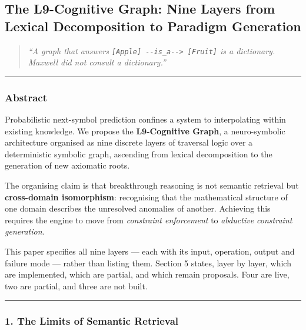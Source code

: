 \documentclass[
  11pt,
  a4paper,
]{article}
\begin{document}
\newpage

\subsection{The L9-Cognitive Graph: Nine Layers from Lexical
Decomposition to Paradigm
Generation}\label{the-l9-cognitive-graph-nine-layers-from-lexical-decomposition-to-paradigm-generation}

\begin{quote}
\emph{``A graph that answers
\texttt{{[}Apple{]}\ -\/-is\_a-\/-\textgreater{}\ {[}Fruit{]}} is a
dictionary. Maxwell did not consult a dictionary.''}
\end{quote}

\begin{center}\rule{0.5\linewidth}{0.5pt}\end{center}

\subsubsection{Abstract}\label{abstract-2}

Probabilistic next-symbol prediction confines a system to interpolating
within existing knowledge. We propose the \textbf{L9-Cognitive Graph}, a
neuro-symbolic architecture organised as nine discrete layers of
traversal logic over a deterministic symbolic graph, ascending from
lexical decomposition to the generation of new axiomatic roots.

The organising claim is that breakthrough reasoning is not semantic
retrieval but \textbf{cross-domain isomorphism}: recognising that the
mathematical structure of one domain describes the unresolved anomalies
of another. Achieving this requires the engine to move from
\emph{constraint enforcement} to \emph{abductive constraint generation}.

This paper specifies all nine layers --- each with its input, operation,
output and failure mode --- rather than listing them. Section 5 states,
layer by layer, which are implemented, which are partial, and which
remain proposals. Four are live, two are partial, and three are not
built.

\begin{center}\rule{0.5\linewidth}{0.5pt}\end{center}

\subsubsection{1. The Limits of Semantic
Retrieval}\label{the-limits-of-semantic-retrieval}
\end{document}
